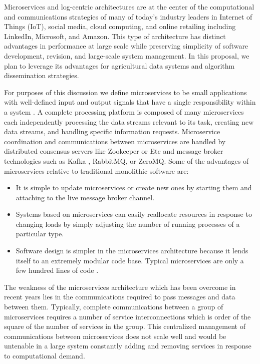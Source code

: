 \documentclass[11pt]{article}
\begin{document}
Microservices and log-centric architectures \cite{Thones:15,Fernandez-Villamor:10} are at the center of the computational and 
communications strategies of many of today's industry leaders in Internet of Things (IoT), social media, cloud computing, and 
online retailing including LinkedIn, Microsoft, and Amazon. This type of architecture has distinct advantages in performance at large 
scale while preserving simplicity of software development, revision, and large-scale system management. In this proposal, we 
plan to leverage its advantages for agricultural data systems and algorithm dissemination strategies.
	
For purposes of this discussion we define microservices to be small applications with well-defined input and output signals that 
have a single responsibility within a system \cite{Sneps-Sneppe:14}. A complete processing platform is composed of many microservices 
each independently processing the data streams relevant to its task, creating new data streams, and handling specific information requests. 
Microservice coordination and communications between microservices are handled by distributed consensus servers like Zookeeper or 
Etc and message broker technologies such as Kafka \cite{Kafka:16}, RabbitMQ, or ZeroMQ. Some of the advantages of 
microservices relative to traditional monolithic software are:

\begin{itemize}
\item It is simple to update microservices or create new ones by starting them and attaching to the live message broker channel.
\item Systems based on microservices can easily reallocate resources in response to changing loads by simply adjusting the 
	number of running processes of a particular type.
\item Software design is simpler in the microservices architecture because it lends itself to an extremely modular code base. 
	Typical microservices are only a few hundred lines of code \cite{Sneps-Sneppe:14}.
\end{itemize}

The weakness of the microservices architecture which has been overcome in recent years lies in the communications required to 
pass messages and data between them. Typically, complete communications between a group of microservices requires a 
number of service interconnections which is order of the square of the number of services in the group. This centralized 
management of communications between microservices does not scale well and would be untenable in a large system constantly 
adding and removing services in response to computational demand. 
\end{document}
